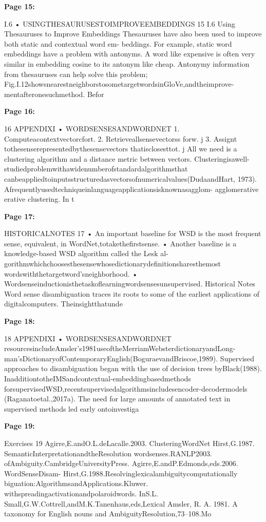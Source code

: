 \documentclass[11pt,a4paper]{article}
\begin{document}
\textbf{Page 15:}

I.6 • USINGTHESAURUSESTOIMPROVEEMBEDDINGS 15
I.6 Using Thesauruses to Improve Embeddings
Thesauruses have also been used to improve both static and contextual word em-
beddings. For example, static word embeddings have a problem with antonyms.
A word like expensive is often very similar in embedding cosine to its antonym
like cheap. Antonymy information from thesauruses can help solve this problem;
Fig.I.12showsnearestneighborstosometargetwordsinGloVe,andtheimprove-
mentafteronesuchmethod.
Befor

\textbf{Page 16:}

16 APPENDIXI • WORDSENSESANDWORDNET
1. Computeacontextvectorcfort.
2. Retrieveallsensevectorss forw.
j
3. Assignt tothesenserepresentedbythesensevectors thatisclosesttot.
j
All we need is a clustering algorithm and a distance metric between vectors.
Clusteringisawell-studiedproblemwithawidenumberofstandardalgorithmsthat
canbeappliedtoinputsstructuredasvectorsofnumericalvalues(DudaandHart,
1973). Afrequentlyusedtechniqueinlanguageapplicationsisknownasagglom-
agglomerative erative clustering. In t

\textbf{Page 17:}

HISTORICALNOTES 17
• An important baseline for WSD is the most frequent sense, equivalent, in
WordNet,totakethefirstsense.
• Another baseline is a knowledge-based WSD algorithm called the Lesk al-
gorithmwhichchoosesthesensewhosedictionarydefinitionsharesthemost
wordswiththetargetword’sneighborhood.
• Wordsenseinductionisthetaskoflearningwordsensesunsupervised.
Historical Notes
Word sense disambiguation traces its roots to some of the earliest applications of
digitalcomputers. Theinsightthatunde

\textbf{Page 18:}

18 APPENDIXI • WORDSENSESANDWORDNET
resourcesincludeAmsler’s1981useoftheMerriamWebsterdictionaryandLong-
man’sDictionaryofContemporaryEnglish(BoguraevandBriscoe,1989).
Supervised approaches to disambiguation began with the use of decision trees
byBlack(1988). InadditiontotheIMSandcontextual-embeddingbasedmethods
forsupervisedWSD,recentsupervisedalgorithmsincludesencoder-decodermodels
(Raganatoetal.,2017a).
The need for large amounts of annotated text in supervised methods led early
ontoinvestiga

\textbf{Page 19:}

Exercises 19
Agirre,E.andO.L.deLacalle.2003. ClusteringWordNet Hirst,G.1987. SemanticInterpretationandtheResolution
wordsenses.RANLP2003. ofAmbiguity.CambridgeUniversityPress.
Agirre,E.andP.Edmonds,eds.2006. WordSenseDisam- Hirst,G.1988.Resolvinglexicalambiguitycomputationally
biguation:AlgorithmsandApplications.Kluwer. withspreadingactivationandpolaroidwords. InS.L.
Small,G.W.Cottrell,andM.K.Tanenhaus,eds,Lexical
Amsler, R. A. 1981. A taxonomy for English nouns and
AmbiguityResolution,73–108.Mo
\end{document}
